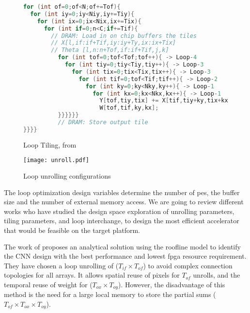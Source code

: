 \begin{figure}
\centering
\begin{lstlisting}[language=Java]
for (int of=0;of<N;of+=Tof){
  for (int iy=0;iy<Niy,iy+=Tiy){
    for (int ix=0;ix<Nix,ix+=Tix){
      for (int if=0;n<C;if+=Tif){
        // DRAM: Load in on chip buffers the tiles
        // X[l,if:if+Tif,iy:iy+Ty,ix:ix+Tix]
        // Theta [l,n:n+Tof,if:if+Tif,j,k]
          for (int tof=0;tof<Tof;tof++){ -> Loop-4
            for (int tiy=0;tiy<Tiy,tiy++){ -> Loop-3
              for (int tix=0;tix<Tix,tix++){ -> Loop-3
                for (int tif=0;tof<Tif;tif++){ -> Loop-2
                  for (int ky=0;ky<Nky,ky++){ -> Loop-1
                    for (int kx=0;kx<Nkx,kx++){ -> Loop-1
                      Y[tof,tiy,tix] += X[tif,tiy+ky,tix+kx] *
                      W[tof,tif,ky,kx];
          }}}}}}
          // DRAM: Store output tile
}}}}
    \end{lstlisting}
    \caption{Loop Tiling, from \cite{abdelouahab_accelerating_2018}}
    \label{fig:looptiling}
\end{figure}
%
\begin{figure}
    \centering
    \texttt{[image: unroll.pdf]}
    \caption{Loop unrolling configurations \cite{ma_optimizing_2018}}
    \label{fog:unroll}
\end{figure}

The loop optimization design variables determine the number of \acrshort{pe}s, the buffer size and the number of external memory access. We are going to review different works who have studied the design space exploration of unrolling parameters, tiling parameters, and loop interchange, to design the most efficient accelerator that would be feasible on the target platform.

The work of \cite{zhang_optimizing_2015} proposes an analytical solution using the roofline model \cite{williams_roofline_2009} to identify the CNN design with the best performance and lowest \acrshort{fpga} resource requirement. They have chosen a loop unrolling of ($T_{if} \times T_{of}$) to avoid complex connection topologies for all arrays. It allows spatial reuse of pixels for $T_{of}$ unrolls, and the temporal reuse of weight for ($T_{ox} \times T_{oy}$). However, the disadvantage of this method is the need for a large local memory to store the partial sums ($T_{of} \times T_{ox} \times T_{oy}$).

